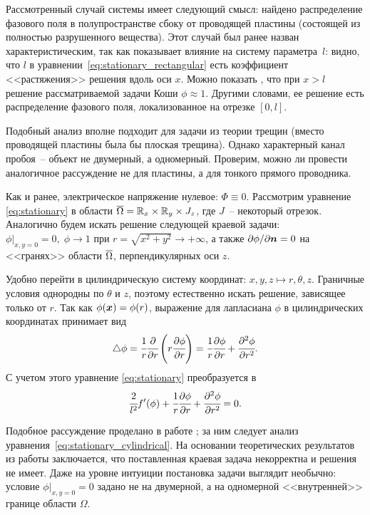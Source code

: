 Рассмотренный случай системы имеет следующий смысл: найдено распределение фазового поля в полупространстве сбоку от проводящей пластины (состоящей из полностью разрушенного вещества). Этот случай был ранее назван характеристическим, так как показывает влияние на систему параметра~$l$: видно, что $l$ в уравнении~\eqref{eq:stationary_rectangular} есть коэффициент <<растяжения>> решения вдоль оси $x$. Можно показать \cite{zipunova_higher_codimension}, что при $x > l$ решение рассматриваемой задачи Коши $\phi \approx 1$. Другими словами, ее решение есть распределение фазового поля, локализованное на отрезке $[0, l]$.

Подобный анализ вполне подходит для задачи из теории трещин (вместо проводящей пластины была бы плоская трещина). Однако характерный канал пробоя~-- объект не двумерный, а одномерный. Проверим, можно ли провести аналогичное рассуждение не для пластины, а для тонкого прямого проводника.

Как и ранее, электрическое напряжение нулевое: $\Phi \equiv 0$. Рассмотрим уравнение \eqref{eq:stationary} в области ${\overline{\Omega}} = {\mathbb{R}}_x \times {\mathbb{R}}_y \times J_z$, где $J$~-- некоторый отрезок. Аналогично будем искать решение следующей краевой задачи: $\phi|_{x, y = 0} = 0, \; \phi \to 1$ при $r = \sqrt{x^2 + y^2} \to +\infty$, а также $\partial \phi / \partial {\boldsymbol{n}} = 0$ на <<гранях>> области ${\overline{\Omega}}$, перпендикулярных оси $z$.

Удобно перейти в цилиндрическую систему координат: $x, y, z \mapsto r, \theta, z$. Граничные условия однородны по $\theta$ и $z$, поэтому естественно искать решение, зависящее только от $r$. Так как $\phi({\boldsymbol{x}}) = \phi(r)$, выражение для лапласиана $\phi$ в цилиндрических координатах принимает вид
$$\triangle \phi = \cfrac{1}{r} \cfrac{\partial }{\partial r} \left( r \cfrac{\partial \phi}{\partial r} \right) = \cfrac{1}{r} \cfrac{\partial \phi}{\partial r} + \cfrac{\partial^2 \phi}{\partial {r}^2} {\text{.}}$$
С учетом этого уравнение \eqref{eq:stationary} преобразуется в
\begin{equation}
	\cfrac{2}{l^2} f'(\phi) + \cfrac{1}{r} \cfrac{\partial \phi}{\partial r} + \cfrac{\partial^2 \phi}{\partial {r}^2} = 0 {\text{.}}
	\label{eq:stationary_cylindrical}
\end{equation}

Подобное рассуждение проделано в работе \cite{zipunova_higher_codimension}; за ним следует анализ уравнения~\eqref{eq:stationary_cylindrical}. На основании теоретических результатов из работы \cite{cirstea_elliptic_equations} заключается, что поставленная краевая задача некорректна и решения не имеет. Даже на уровне интуиции постановка задачи выглядит необычно: условие $\phi|_{x, y = 0} = 0$ задано не на двумерной, а на одномерной <<внутренней>> границе области $\Omega$.

